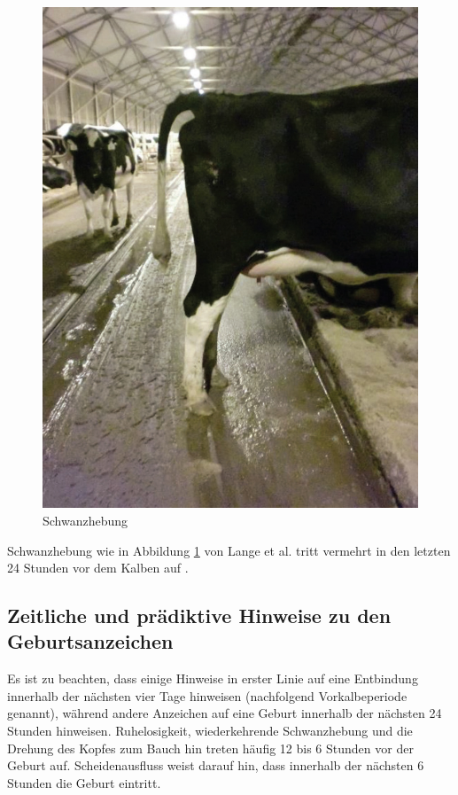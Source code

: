 \begin{figure}[H]
	\center
	\includegraphics[scale=.45]{Grafiken/schwanzhebung.jpg}
	\caption{Schwanzhebung}
	\label{fig: Schwanzhebung}
\end{figure}

Schwanzhebung wie in Abbildung  \ref{fig: Schwanzhebung} von Lange et al. tritt vermehrt in den letzten 24 Stunden vor dem Kalben auf \cite[S. 1 f.]{Lange2017}.
\subsection{Zeitliche und prädiktive Hinweise zu den Geburtsanzeichen}
Es ist zu beachten, dass einige Hinweise in erster Linie auf eine Entbindung innerhalb der nächsten vier Tage hinweisen (nachfolgend Vorkalbeperiode genannt), während andere Anzeichen auf eine Geburt innerhalb der nächsten 24 Stunden hinweisen. Ruhelosigkeit, wiederkehrende Schwanzhebung und die Drehung des Kopfes zum Bauch hin treten häufig 12 bis 6 Stunden vor der Geburt auf. Scheidenausfluss weist darauf hin, dass innerhalb der nächsten 6 Stunden die Geburt eintritt. \citep[S. 1]{Lange2017}

